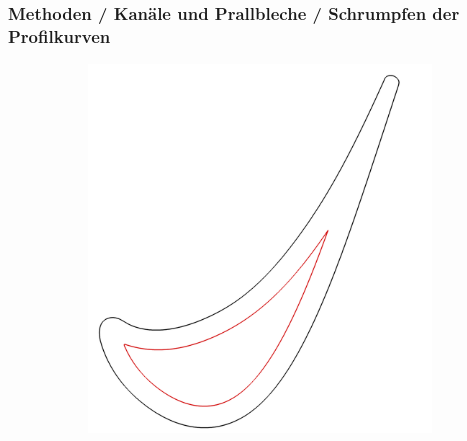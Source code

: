 \documentclass[8pt, aspectratio=169]{beamer}
\begin{document}
\begin{frame}
	\frametitle{Methoden / Kanäle und Prallbleche / Schrumpfen der Profilkurven}
	\vspace{-1cm}\hspace{-0.5cm}
	\begin{figure}
		\centering
		\begin{subfigure}[t]{.49\textwidth}
			\includegraphics[height=.8\textheight]{../tec/shrinking/12.png}
		\end{subfigure}
	\end{figure}
\end{frame}
\end{document}
